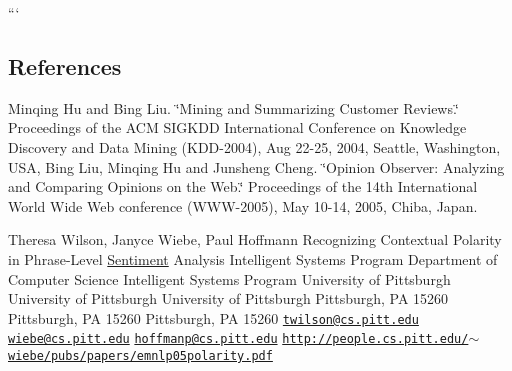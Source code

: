 ```

\subsection*{References}

Minqing Hu and Bing Liu. \char`\"{}\-Mining and Summarizing Customer Reviews.\char`\"{} Proceedings of the A\-C\-M S\-I\-G\-K\-D\-D International Conference on Knowledge Discovery and Data Mining (K\-D\-D-\/2004), Aug 22-\/25, 2004, Seattle, Washington, U\-S\-A, Bing Liu, Minqing Hu and Junsheng Cheng. \char`\"{}\-Opinion Observer\-: Analyzing 
        and Comparing Opinions on the Web.\char`\"{} Proceedings of the 14th International World Wide Web conference (W\-W\-W-\/2005), May 10-\/14, 2005, Chiba, Japan.

Theresa Wilson, Janyce Wiebe, Paul Hoffmann Recognizing Contextual Polarity in Phrase-\/\-Level \hyperlink{classSentiment}{Sentiment} Analysis Intelligent Systems Program Department of Computer Science Intelligent Systems Program University of Pittsburgh University of Pittsburgh University of Pittsburgh Pittsburgh, P\-A 15260 Pittsburgh, P\-A 15260 Pittsburgh, P\-A 15260 \href{mailto:twilson@cs.pitt.edu}{\tt twilson@cs.\-pitt.\-edu} \href{mailto:wiebe@cs.pitt.edu}{\tt wiebe@cs.\-pitt.\-edu} \href{mailto:hoffmanp@cs.pitt.edu}{\tt hoffmanp@cs.\-pitt.\-edu} \href{http://people.cs.pitt.edu/~wiebe/pubs/papers/emnlp05polarity.pdf}{\tt http\-://people.\-cs.\-pitt.\-edu/$\sim$wiebe/pubs/papers/emnlp05polarity.\-pdf} 